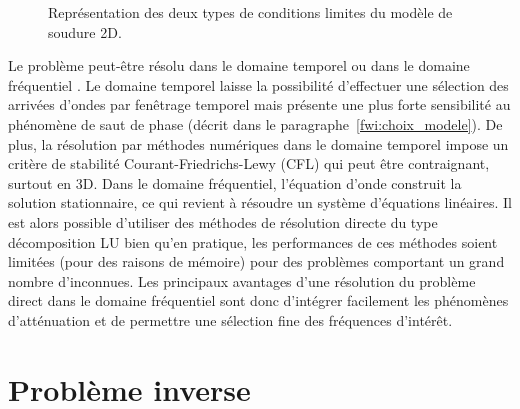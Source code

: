 \begin{figure}[!h]
	\caption{Représentation des deux types de conditions limites du modèle de soudure 2D.\label{BC}}
\end{figure}


Le problème peut-être résolu dans le domaine temporel ou dans le domaine fréquentiel \citep{vigh_2008}. Le domaine temporel laisse la possibilité d'effectuer une sélection des arrivées d'ondes par fenêtrage temporel mais présente une plus forte sensibilité au phénomène de saut de phase (décrit dans le paragraphe~\ref{fwi:choix_modele}).  De plus, la résolution par méthodes numériques dans le domaine temporel impose un critère de stabilité Courant-Friedrichs-Lewy (CFL) qui peut être contraignant, surtout en 3D. Dans le domaine fréquentiel, l'équation d'onde construit la solution stationnaire, ce qui revient à résoudre un système d'équations linéaires. Il est alors possible d'utiliser des méthodes de résolution directe du type décomposition LU bien qu'en pratique, les performances de ces méthodes soient limitées (pour des raisons de mémoire) pour des problèmes comportant un grand nombre d'inconnues.  Les principaux avantages d'une résolution du problème direct dans le domaine fréquentiel sont donc d'intégrer facilement les phénomènes d'atténuation et de permettre une sélection fine des fréquences d'intérêt. 







\section{Problème inverse}

